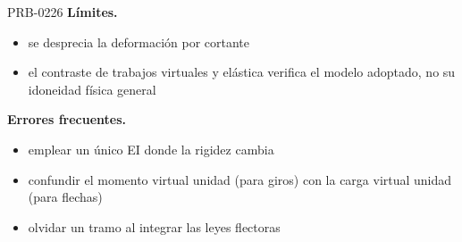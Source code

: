 \begin{studiumworked}{PRB-0226}
\textbf{Límites.}\begin{itemize}\item se desprecia la deformación por cortante
\item el contraste de trabajos virtuales y elástica verifica el modelo adoptado, no su idoneidad física general\end{itemize}

\textbf{Errores frecuentes.}\begin{itemize}\item emplear un único EI donde la rigidez cambia
\item confundir el momento virtual unidad (para giros) con la carga virtual unidad (para flechas)
\item olvidar un tramo al integrar las leyes flectoras\end{itemize}

\end{studiumworked}

\Needspace{.3\textheight}

